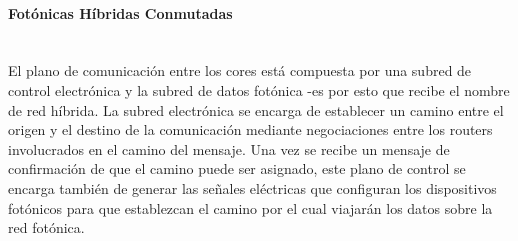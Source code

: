 \paragraph{Fotónicas Híbridas Conmutadas}~\\

El plano de comunicación entre los cores 
está compuesta por una subred de control electrónica y la subred de datos
fotónica -es por esto que recibe el nombre de red híbrida.
La subred electrónica se encarga de establecer
un camino entre el origen y el destino de la comunicación mediante
negociaciones entre los routers involucrados en el camino del mensaje.
Una vez se recibe un mensaje de confirmación de que el 
camino puede ser asignado, este plano de control se encarga también de 
generar las señales eléctricas que configuran los dispositivos fotónicos 
para que establezcan el camino por el cual viajarán los datos sobre la
red fotónica.

